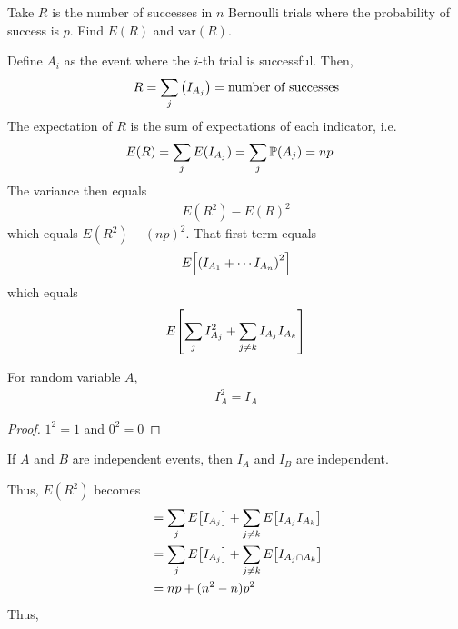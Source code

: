 \begin{example}
    Take $R$ is the number of successes in $n$ Bernoulli trials where the probability of success is $p$. Find $E(R)$ and $\text{var}(R)$.
\end{example}
\begin{solution}
    Define $A_i$ as the event where the $i$-th trial is successful. Then,
    \begin{align}
        R = \sum_j\qty(I_{A_j}) = \text{number of successes}
    \end{align}
    The expectation of $R$ is the sum of expectations of each indicator, i.e.
    \begin{align}
        E(R) = \sum_j E(I_{A_j}) = \sum_j \mathbb{P}(A_j) = np & \qedhere
    \end{align}
    The variance then equals
    \begin{align}
        E(R^2) - E(R)^2
    \end{align}
    which equals $E(R^2) - (np)^2$. That first term equals
    \begin{align}
        E\qty[\qty(I_{A_1} + \cdots I_{A_n})^2]
    \end{align}
    which equals
    \begin{align}
        E\qty[
            \sum_j I_{A_j}^2 + \sum_{j \ne k} I_{A_j}I_{A_k}
        ]   
    \end{align}
    \begin{aside}
        For random variable $A$,
        \begin{align}
            I_A^2 = I_A
        \end{align}
        \begin{proof}
            $1^2 = 1$ and $0^2 = 0$
        \end{proof}
    \end{aside}
    \begin{aside}
        If $A$ and $B$ are independent events, then $I_A$ and $I_B$ are independent.
    \end{aside}
    Thus, $E(R^2)$ becomes
    \begin{align}
        &= \sum_j E\qty[
            I_{A_j}
        ] + \sum_{j \ne k} E\qty[
            I_{A_j}I_{A_k}
        ]\\
        &= \sum_j E\qty[
            I_{A_j}
        ] + \sum_{j \ne k} E\qty[
            I_{A_j \cap A_k}
        ]\\
        &= np + (n^2 - n)p^2
    \end{align}
    Thus,
    \begin{align}

\end{align}
\end{solution}
